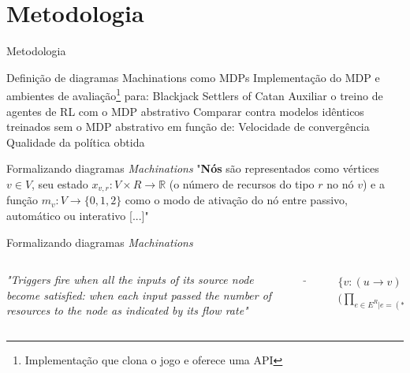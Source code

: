 \documentclass[aspectratio=169]{beamer}
\begin{document}
\section{Metodologia}

\begin{frame}{Metodologia}
    \begin{outline}[enumerate]
	\1 Definição de diagramas Machinations como MDPs
	\1 Implementação do MDP e ambientes de avaliação\footnote{Implementação que clona o jogo e oferece uma API} para:
            \2 Blackjack
            \2 Settlers of Catan
	\1 Auxiliar o treino de agentes de RL com o MDP abstrativo
	\1 Comparar contra modelos idênticos treinados sem o MDP abstrativo em função de:
	    \2 Velocidade de convergência
	    \2 Qualidade da política obtida
    \end{outline}
\end{frame}

\begin{frame}{Formalizando diagramas \textit{Machinations}}
    "\textbf{Nós} são representados como vértices $v \in V$, seu estado $x_{v,r}: V \times R \rightarrow \mathbb{R}$ (o número de recursos do tipo $r$ no nó $v$) e a função $m_{v}: V \rightarrow \{0,1,2\}$ como o modo de ativação do nó entre passivo, automático ou interativo [...]"
\end{frame}

\begin{frame}{Formalizando diagramas \textit{Machinations}}

    \begin{columns}
        \begin{column}{0.4\textwidth}
            \vspace{0.75cm}

            \textit{"Triggers fire when all the inputs of its source node become satisfied: when each input passed the number of resources to the node as indicated by its flow rate"}
        \end{column}
        \begin{column}{0.1\textwidth}
            \begin{center}
                $\rightarrow$
            \end{center}
        \end{column}
        \begin{column}{0.4\textwidth}
            \vspace{0.75cm}
            \begin{align*}
                &\{v: (u \rightarrow v) \in E^G\ | \\\ &\Big(\prod_{e \in E^R | e = (* \rightarrow u)}{\Delta e(t-1) = T_e \Big)} = 1 \}\\
            \end{align*}
        \end{column}
    \end{columns}
\end{frame}
\end{document}
